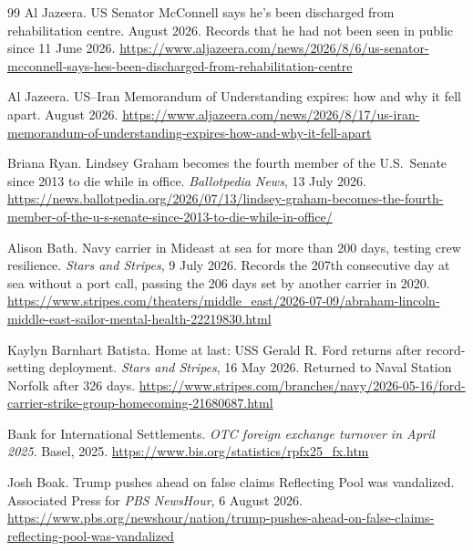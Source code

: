 \documentclass[11pt,a4paper]{article}
\theoremstyle{remark}
\begin{document}
\begin{thebibliography}{99}
Al Jazeera.
\newblock US Senator McConnell says he's been discharged from rehabilitation centre.
 August 2026. Records that he had not been seen in public since 11 June 2026.
\newblock \url{https://www.aljazeera.com/news/2026/8/6/us-senator-mcconnell-says-hes-been-discharged-from-rehabilitation-centre}

Al Jazeera.
\newblock US--Iran Memorandum of Understanding expires: how and why it fell apart.
 August 2026.
\newblock \url{https://www.aljazeera.com/news/2026/8/17/us-iran-memorandum-of-understanding-expires-how-and-why-it-fell-apart}


Briana Ryan.
\newblock Lindsey Graham becomes the fourth member of the U.S.\ Senate since 2013 to die while in office.
\newblock \emph{Ballotpedia News}, 13 July 2026.
\newblock \url{https://news.ballotpedia.org/2026/07/13/lindsey-graham-becomes-the-fourth-member-of-the-u-s-senate-since-2013-to-die-while-in-office/}

Alison Bath.
\newblock Navy carrier in Mideast at sea for more than 200 days, testing crew resilience.
\newblock \emph{Stars and Stripes}, 9 July 2026. Records the 207th consecutive day at sea without a port
call, passing the 206 days set by another carrier in 2020.
\newblock \url{https://www.stripes.com/theaters/middle_east/2026-07-09/abraham-lincoln-middle-east-sailor-mental-health-22219830.html}

Kaylyn Barnhart Batista.
\newblock Home at last: USS Gerald R. Ford returns after record-setting deployment.
\newblock \emph{Stars and Stripes}, 16 May 2026. Returned to Naval Station Norfolk after 326 days.
\newblock \url{https://www.stripes.com/branches/navy/2026-05-16/ford-carrier-strike-group-homecoming-21680687.html}

Bank for International Settlements.
\newblock \emph{OTC foreign exchange turnover in April 2025}.
\newblock Basel, 2025.
\newblock \url{https://www.bis.org/statistics/rpfx25_fx.htm}

Josh Boak.
\newblock Trump pushes ahead on false claims Reflecting Pool was vandalized.
\newblock Associated Press for \emph{PBS NewsHour}, 6 August 2026.
\newblock \url{https://www.pbs.org/newshour/nation/trump-pushes-ahead-on-false-claims-reflecting-pool-was-vandalized}


\end{thebibliography}
\end{document}

